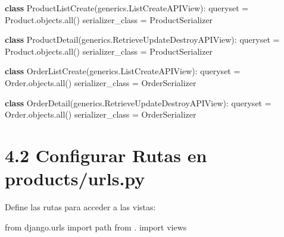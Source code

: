 \documentclass[
  a4paper,
  DIV=11,
  numbers=noendperiod,
  onepage,
  openany]{scrreprt}
\newenvironment{Shaded}{\begin{snugshade}}{\end{snugshade}}
\newcommand{\BuiltInTok}[1]{\textcolor[rgb]{0.00,0.23,0.31}{#1}}
\newcommand{\ImportTok}[1]{\textcolor[rgb]{0.00,0.46,0.62}{#1}}
\newcommand{\KeywordTok}[1]{\textcolor[rgb]{0.00,0.23,0.31}{\textbf{#1}}}
\newcommand{\NormalTok}[1]{\textcolor[rgb]{0.00,0.23,0.31}{#1}}
\newcommand{\OperatorTok}[1]{\textcolor[rgb]{0.37,0.37,0.37}{#1}}
\begin{document}
\begin{tcolorbox}
\begin{Shaded}
\begin{Highlighting}[]
\KeywordTok{class}\NormalTok{ ProductListCreate(generics.ListCreateAPIView):}
\NormalTok{    queryset }\OperatorTok{=}\NormalTok{ Product.objects.}\BuiltInTok{all}\NormalTok{()}
\NormalTok{    serializer\_class }\OperatorTok{=}\NormalTok{ ProductSerializer}

\KeywordTok{class}\NormalTok{ ProductDetail(generics.RetrieveUpdateDestroyAPIView):}
\NormalTok{    queryset }\OperatorTok{=}\NormalTok{ Product.objects.}\BuiltInTok{all}\NormalTok{()}
\NormalTok{    serializer\_class }\OperatorTok{=}\NormalTok{ ProductSerializer}

\KeywordTok{class}\NormalTok{ OrderListCreate(generics.ListCreateAPIView):}
\NormalTok{    queryset }\OperatorTok{=}\NormalTok{ Order.objects.}\BuiltInTok{all}\NormalTok{()}
\NormalTok{    serializer\_class }\OperatorTok{=}\NormalTok{ OrderSerializer}

\KeywordTok{class}\NormalTok{ OrderDetail(generics.RetrieveUpdateDestroyAPIView):}
\NormalTok{    queryset }\OperatorTok{=}\NormalTok{ Order.objects.}\BuiltInTok{all}\NormalTok{()}
\NormalTok{    serializer\_class }\OperatorTok{=}\NormalTok{ OrderSerializer}
\end{Highlighting}
\end{Shaded}

\section{4.2 Configurar Rutas en
products/urls.py}\label{configurar-rutas-en-productsurls.py}

Define las rutas para acceder a las vistas:

\begin{Shaded}
\begin{Highlighting}[]
\ImportTok{from}\NormalTok{ django.urls }\ImportTok{import}\NormalTok{ path}
\ImportTok{from}\NormalTok{ . }\ImportTok{import}\NormalTok{ views}


\end{Highlighting}
\end{Shaded}
\end{tcolorbox}
\end{document}
